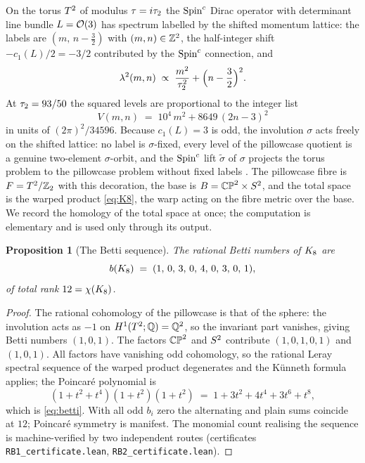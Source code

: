 \documentclass[11pt]{article}
\numberwithin{equation}{section}
\theoremstyle{plain}
\newtheorem{proposition}[theorem]{Proposition}
\theoremstyle{definition}
\theoremstyle{remark}
\newcommand{\stildec}{\tilde{\sigma}}
\begin{document}
On the torus $T^2$ of modulus $\tau = i\tau_2$ the $\text{Spin}^c$
Dirac operator with determinant line bundle $L = \mathcal{O}(3)$ has
spectrum labelled by the shifted momentum lattice: the labels are
$(m,\, n - \tfrac{3}{2})$ with $(m, n) \in \mathbb{Z}^{2}$, the
half-integer shift $-c_{1}(L)/2 = -3/2$ contributed by the
$\text{Spin}^c$ connection, and
\begin{equation}\label{eq:spectrum}
\lambda^{2}(m, n) \;\propto\;
\frac{m^{2}}{\tau_2^{2}} + \Bigl(n - \frac{3}{2}\Bigr)^{2}.
\end{equation}
At $\tau_2 = 93/50$ the squared levels are proportional to the
integer list
\begin{equation}\label{eq:levellist}
V(m, n) \;=\; 10^{4}\,m^{2} + 8649\,(2n - 3)^{2}
\end{equation}
in units of $(2\pi)^{2}/34596$. Because $c_{1}(L) = 3$ is odd, the
involution $\sigma$ acts freely on the shifted lattice: no label is
$\sigma$-fixed, every level of the pillowcase quotient is a genuine
two-element $\sigma$-orbit, and the $\text{Spin}^c$ lift $\stildec$ of
$\sigma$ projects the torus problem to the pillowcase problem
without fixed labels \cite{MEF3}. The pillowcase fibre is
$F = T^2/\mathbb{Z}_2$ with this decoration, the base is
$B = \mathbb{CP}^2 \times S^2$, and the total space is the warped
product \eqref{eq:K8}, the warp acting on the fibre metric over the
base. We record the homology of the total space at once; the
computation is elementary and is used only through its output.

\begin{proposition}[The Betti sequence]\label{prop:betti}
The rational Betti numbers of $K_8$ are
\begin{equation}\label{eq:betti}
b(K_8) \;=\; (1,\, 0,\, 3,\, 0,\, 4,\, 0,\, 3,\, 0,\, 1),
\end{equation}
of total rank $12 = \chi(K_8)$.
\end{proposition}

\begin{proof}
The rational cohomology of the pillowcase is that of the sphere:
the involution acts as $-1$ on $H^{1}(T^2; \mathbb{Q}) = \mathbb{Q}^{2}$, so the
invariant part vanishes, giving Betti numbers $(1, 0, 1)$. The
factors $\mathbb{CP}^2$ and $S^2$ contribute $(1, 0, 1, 0, 1)$ and
$(1, 0, 1)$. All factors have vanishing odd cohomology, so the
rational Leray spectral sequence of the warped product degenerates
and the K\"unneth formula applies; the Poincar\'e polynomial is
\[
(1 + t^{2} + t^{4})(1 + t^{2})(1 + t^{2})
\;=\; 1 + 3t^{2} + 4t^{4} + 3t^{6} + t^{8},
\]
which is \eqref{eq:betti}. With all odd $b_{i}$ zero the
alternating and plain sums coincide at $12$; Poincar\'e symmetry is
manifest. The monomial count realising the sequence is
machine-verified by two independent routes (certificates
\texttt{RB1\_certificate.lean}, \texttt{RB2\_certificate.lean}).
\end{proof}
\end{document}
